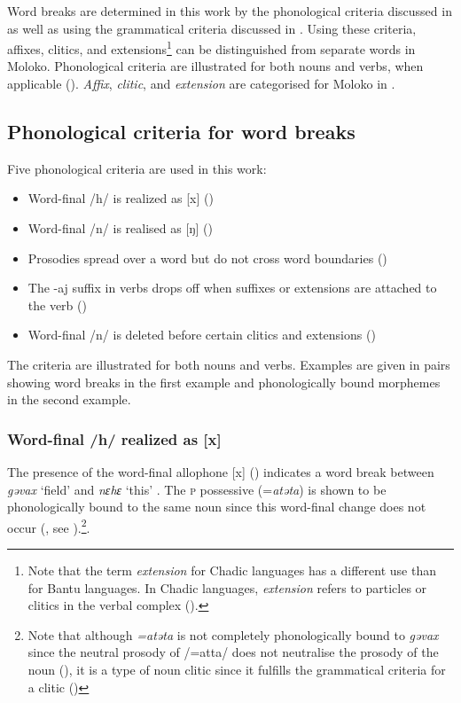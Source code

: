 \largerpage Word breaks are determined in this work by the phonological criteria discussed in  as well as using the grammatical criteria discussed in . Using these criteria, affixes, clitics, and extensions\footnote{Note that the term \textit{extension} for Chadic languages has a different use than for Bantu languages. In Chadic languages, \textit{extension} refers to particles or clitics in the verbal complex ().} can be distinguished from separate words in Moloko. Phonological criteria are illustrated for both nouns and verbs, when applicable (). \textit{Affix}, \textit{clitic}, and \textit{extension} are categorised for Moloko in .

\subsection{Phonological criteria for word breaks}\label{sec:2.6.1}
\hypertarget{RefHeading1210761525720847}{}
Five phonological criteria are used in this work:
\begin{itemize}
 \item Word-final /h/ is realized as [x] ()
 \item Word-final /n/ is realised as [ŋ] ()
 \item Prosodies spread over a word but do not cross word boundaries ()
 \item The -aj suffix in verbs drops off when suffixes or extensions are attached to the verb ()
 \item Word-final /n/ is deleted before certain clitics and extensions ()
\end{itemize}
The criteria are illustrated for both nouns and verbs. Examples are given in pairs showing word breaks in the first example and phonologically bound morphemes in the second example. 

\subsubsection{Word-final /h/ realized as [x]}\label{sec:2.6.1.1}

 The presence of the word-final allophone [x] (\citealt{Bow1997c}) indicates a word break between \textit{gəvax} ‘field' and \textit{nɛhɛ} ‘this' . The \textsc{p} possessive (=\textit{atəta}) is shown to be phonologically bound to the same noun  since this word-final change does not occur (\citealt{Bow1997c}, see ).\footnote{Note that although \textit{=atəta} is not completely phonologically bound to \textit{gəvax} since the neutral prosody of /=atta/ does not neutralise the prosody of the noun (), it is a type of noun clitic since it fulfills the grammatical criteria for a clitic ()}. 

